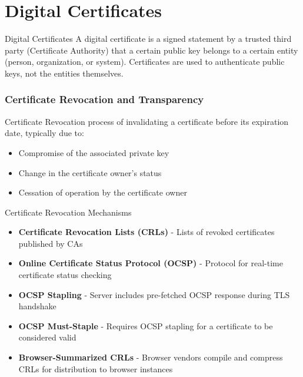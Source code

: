 \section{Digital Certificates}

\small



\begin{definition}{Digital Certificates}
A digital certificate is a signed statement by a trusted third party (Certificate Authority) that a certain public key belongs to a certain entity (person, organization, or system). Certificates are used to authenticate public keys, not the entities themselves.
\end{definition}



\subsubsection{Certificate Revocation and Transparency}



\begin{definition}{Certificate Revocation}
     process of invalidating a certificate before its expiration date, typically due to:
\begin{itemize}
    \item Compromise of the associated private key
    \item Change in the certificate owner's status
    \item Cessation of operation by the certificate owner
\end{itemize}
\end{definition}

\begin{theorem}{Certificate Revocation Mechanisms}
\begin{itemize}
    \item \textbf{Certificate Revocation Lists (CRLs)} - Lists of revoked certificates published by CAs
    \item \textbf{Online Certificate Status Protocol (OCSP)} - Protocol for real-time certificate status checking
    \item \textbf{OCSP Stapling} - Server includes pre-fetched OCSP response during TLS handshake
    \item \textbf{OCSP Must-Staple} - Requires OCSP stapling for a certificate to be considered valid
    \item \textbf{Browser-Summarized CRLs} - Browser vendors compile and compress CRLs for distribution to browser instances
\end{itemize}
\end{theorem}

